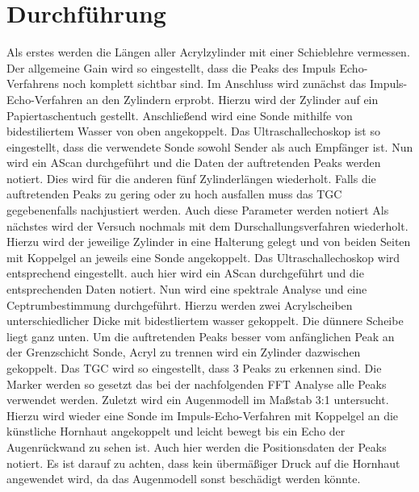 
\section{Durchführung}
\label{sec:Durchführung}
Als erstes werden die Längen aller Acrylzylinder mit einer Schieblehre vermessen.
Der allgemeine Gain wird so eingestellt, dass die Peaks des Impuls Echo-Verfahrens
noch komplett sichtbar sind.
Im Anschluss wird zunächst das Impuls-Echo-Verfahren an den Zylindern erprobt.
Hierzu wird der Zylinder auf ein Papiertaschentuch gestellt. Anschließend wird eine Sonde
 mithilfe von bidestiliertem Wasser von oben angekoppelt. Das Ultraschallechoskop
 ist so eingestellt, dass die verwendete Sonde sowohl Sender als auch Empfänger ist.
 Nun wird ein AScan durchgeführt und die Daten der auftretenden Peaks werden notiert.
 Dies wird für die anderen fünf Zylinderlängen wiederholt. Falls die auftretenden
 Peaks zu gering oder zu hoch ausfallen muss das TGC gegebenenfalls nachjustiert werden.
  Auch diese Parameter werden notiert
 Als nächstes wird der Versuch nochmals mit dem Durschallungsverfahren wiederholt.
 Hierzu wird der jeweilige Zylinder in eine Halterung gelegt und von beiden
 Seiten mit Koppelgel an jeweils eine Sonde angekoppelt. Das Ultraschallechoskop
 wird entsprechend eingestellt. auch hier wird ein AScan durchgeführt und die
 entsprechenden Daten notiert.
 Nun wird eine spektrale Analyse und eine Ceptrumbestimmung durchgeführt. Hierzu
 werden zwei Acrylscheiben unterschiedlicher Dicke mit bidestliertem wasser gekoppelt.
 Die dünnere Scheibe liegt ganz unten. Um die auftretenden Peaks besser vom
 anfänglichen Peak an der Grenzschicht Sonde, Acryl zu trennen wird ein Zylinder
 dazwischen gekoppelt. Das TGC wird so eingestellt, dass 3 Peaks zu erkennen sind.
 Die Marker werden so gesetzt das bei der nachfolgenden FFT Analyse alle Peaks
 verwendet werden.
 Zuletzt wird ein Augenmodell im Maßstab 3:1 untersucht. Hierzu wird wieder eine
 Sonde im Impuls-Echo-Verfahren mit Koppelgel an die künstliche Hornhaut angekoppelt
 und leicht bewegt bis ein Echo der Augenrückwand zu sehen ist. Auch hier werden
 die Positionsdaten der Peaks notiert. Es ist darauf zu achten, dass kein übermäßiger
 Druck auf die Hornhaut angewendet wird, da das Augenmodell sonst beschädigt werden könnte.   
